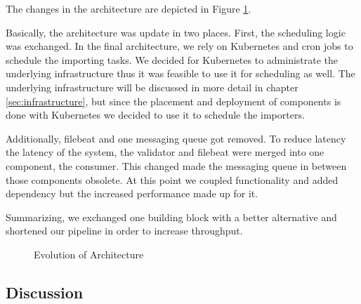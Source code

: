 The changes in the architecture are depicted in Figure \ref{fig:evol_architecture}.

Basically, the architecture was update in two places. First, the scheduling logic was exchanged. In the
final architecture, we rely on Kubernetes and cron jobs to schedule the
importing tasks. We decided for Kubernetes to administrate the
underlying infrastructure thus it was feasible to use it for scheduling
as well. The underlying infrastructure will be discussed in more detail
in chapter \ref{sec:infrastructure}, but since the placement and deployment
of components is done with Kubernetes we decided to use it to schedule
the importers.

Additionally, filebeat and one messaging queue got removed. To reduce
latency the latency of the system, the validator and filebeat were
merged into one component, the consumer. This changed made the messaging
queue in between those components obsolete. At this point we coupled
functionality and added dependency but the increased performance made up
for it.

Summarizing, we exchanged one building block with a better alternative
and shortened our pipeline in order to increase throughput.

\begin{figure}
	\caption{Evolution of Architecture}
	\label{fig:evol_architecture}
\end{figure}

\subsection{Discussion}\label{discussion}

